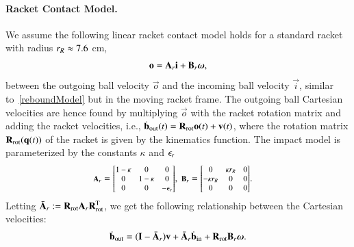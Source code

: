 \paragraph{Racket Contact Model.}  We assume the following linear racket contact model holds for a standard racket with radius $r_{R} \approx 7.6$ cm,
%
\begin{align}
\boldsymbol{\mathrm{o}} = \boldsymbol{\mathrm{A}}_r\boldsymbol{\mathrm{i}} + \boldsymbol{\mathrm{B}}_r\boldsymbol{\mathrm{\omega}},
\label{contactModel}
\end{align}
%
\noindent between the outgoing ball velocity $\vec{o}$ and the incoming ball velocity $\vec{i}$, similar to~\eqref{reboundModel} but in the moving racket frame. The outgoing ball Cartesian velocities are hence found by multiplying $\vec{o}$ with the racket rotation matrix and adding the racket velocities, i.e., $\dot{\boldsymbol{\mathrm{b}}}_{\mathrm{out}}(t) = \boldsymbol{\mathrm{R}}_{\mathrm{rot}}\boldsymbol{\mathrm{o}}(t) + \boldsymbol{\mathrm{v}}(t)$, where the rotation matrix $\boldsymbol{\mathrm{R}}_{\mathrm{rot}}(\boldsymbol{\mathrm{q}}(t))$ of the racket is given by the kinematics function. The impact model is parameterized by the constants $\kappa$ and $\epsilon_r$
%
\begin{align}
\scalemath{0.8}{\racketContact} &= \scalemath{0.8}{\begin{bmatrix}
1 - \kappa & 0 & 0 \\
0 & 1 - \kappa & 0 \\
0 & 0 & -\coeffRestitutionRacket
\end{bmatrix}}, \ 
\scalemath{0.8}{\racketContactSpin} = \scalemath{0.8}{\begin{bmatrix}
0 & \kappa\racketRadius & 0 \\
-\kappa\racketRadius & 0 & 0 \\
0 & 0 & 0
\end{bmatrix}}.
\label{racketMatrices}
\end{align}
%
Letting $\bar{\boldsymbol{\mathrm{A}}}_r := \boldsymbol{\mathrm{R}}_{\mathrm{rot}}\boldsymbol{\mathrm{A}}_r\boldsymbol{\mathrm{R}}_{\mathrm{rot}}^{\mathrm{T}}$, we get the following relationship between the Cartesian velocities:
%
\begin{align}
\dot{\boldsymbol{\mathrm{b}}}_{\mathrm{out}} = (\boldsymbol{\mathrm{I}}-\bar{\boldsymbol{\mathrm{A}}}_r)\boldsymbol{\mathrm{v}} + \bar{\boldsymbol{\mathrm{A}}}_r\dot{\boldsymbol{\mathrm{b}}}_{\mathrm{in}} + \boldsymbol{\mathrm{R}}_{\mathrm{rot}}\boldsymbol{\mathrm{B}}_r\boldsymbol{\mathrm{\omega}}.
\end{align}

%

